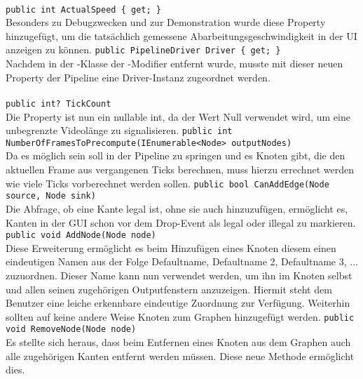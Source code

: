 \paragraph{}
\begin{itemize}
	\add \verb!public int ActualSpeed { get; }! \\
	Besonders zu Debugzwecken und zur Demonstration wurde diese Property hinzugefügt, um die tatsächlich gemessene Abarbeitungsgeschwindigkeit in der UI anzeigen zu können.
	\add \verb!public PipelineDriver Driver { get; }! \\
	Nachdem in der -Klasse der -Modifier entfernt wurde, musste mit dieser neuen Property der Pipeline eine Driver-Instanz zugeordnet werden.

\end{itemize}

\paragraph{}
\begin{itemize}
	\change \verb!public int? TickCount! \\
	Die Property ist nun ein nullable int, da der Wert Null verwendet wird, um eine unbegrenzte Videolänge zu signalisieren.
	\add \verb!public int NumberOfFramesToPrecompute(IEnumerable<Node> outputNodes)! \\
	Da es möglich sein soll in der Pipeline zu springen und es Knoten gibt, die den aktuellen Frame aus vergangenen Ticks berechnen, muss hierzu errechnet werden wie viele Ticks vorberechnet werden sollen.
	\add \verb!public bool CanAddEdge(Node source, Node sink)! \\
	Die Abfrage, ob eine Kante legal ist, ohne sie auch hinzuzufügen, ermöglicht es, Kanten in der GUI schon vor dem Drop-Event als legal oder illegal zu markieren.
	\add \verb!public void AddNode(Node node)! \\
	Diese Erweiterung ermöglicht es beim Hinzufügen eines Knoten diesem einen eindeutigen Namen aus der Folge Defaultname, Defaultname 2, Defaultname 3, ... zuzuordnen. Dieser Name kann nun verwendet werden, um ihn im Knoten selbst und allen seinen zugehörigen Outputfenstern anzuzeigen. Hiermit steht dem Benutzer eine leiche erkennbare eindeutige Zuordnung zur Verfügung. Weiterhin sollten auf keine andere Weise Knoten zum Graphen hinzugefügt werden.
	\add \verb!public void RemoveNode(Node node)! \\
	Es stellte sich heraus, dass beim Entfernen eines Knoten aus dem Graphen auch alle zugehörigen Kanten entfernt werden müssen. Diese neue Methode ermöglicht dies.
\end{itemize}

